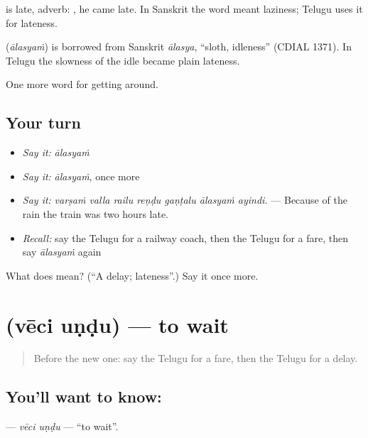  is late, adverb:  , he came late. In Sanskrit the word meant laziness; Telugu uses it for lateness.

\begin{cousinweb}
\textbf{} (\emph{ālasyaṁ}) is borrowed from Sanskrit \emph{ālasya}, \textquotedblleft{}sloth, idleness\textquotedblright{} (CDIAL 1371). In Telugu the slowness of the idle became plain lateness.
\end{cousinweb}

\begin{grammarlens}[title={What you've built}]
One more word for getting around.
\end{grammarlens}

\subsection*{Your turn}
\begin{itemize}
\raggedright
  \item \emph{Say it:} \emph{ālasyaṁ}
  \item \emph{Say it:} \emph{ālasyaṁ}, once more
  \item \emph{Say it:} \emph{varṣaṁ valla railu reṇḍu gaṇṭalu ālasyaṁ ayindi.} — Because of the rain the train was two hours late.
  \item \emph{Recall:} say the Telugu for a railway coach, then the Telugu for a fare, then say \emph{ālasyaṁ} again
\end{itemize}

\begin{tcolorbox}[breakable,colback=teal!4,colframe=teal!35!black,title={Before you move on}]
What does  mean? (\textquotedblleft{}A delay; lateness\textquotedblright{}.) Say it once more.
\end{tcolorbox}
\section[\texorpdfstring{\te{వేచి} \te{ఉండు} (vēci uṇḍu)}{వేచి ఉండు (vēci uṇḍu)}]{  (vēci uṇḍu) — to wait}

\label{lesson:TE-C440-veci-undu}



\begin{quote}
Before the new one: say the Telugu for a fare, then the Telugu for a delay.
\end{quote}

\subsection*{You'll want to know:  }
\textbf{ } — \emph{vēci uṇḍu} — \textquotedblleft{}to wait\textquotedblright{}.

